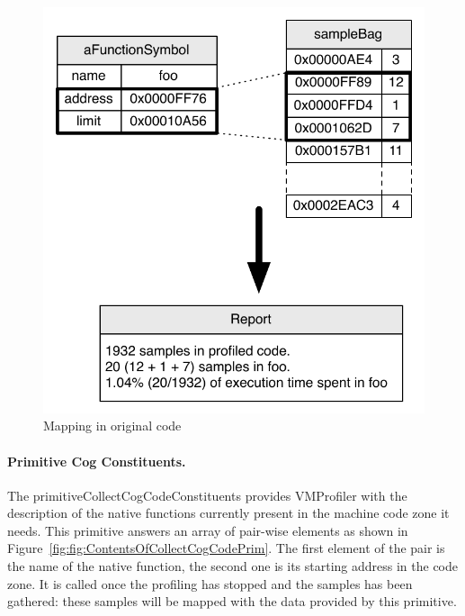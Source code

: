 \documentclass[10pt,preprint,nonatbib]{sigplanconf}
\newcommand{\figlabel}[1]{\label{fig:#1}}
\newcommand{\figref}[1]{Figure~\ref{fig:#1}}
\begin{document}
 \begin{figure}[!htp]
     \begin{center}
         \includegraphics[width=0.9\linewidth]{OriginalMapping}
         \caption{Mapping in original code}
         \figlabel{fig:OriginalMapping}
     \end{center}
 \end{figure}
 
 
 \paragraph{Primitive Cog Constituents.}
The primitiveCollectCogCodeConstituents provides VMProfiler with the description of the native functions currently present in the machine code zone it needs. 
This primitive answers an array of pair-wise elements as shown in \figref{fig:ContentsOfCollectCogCodePrim}. The first element of the pair is the name of the native function, the second one is its starting address in the code zone.
It is called once the profiling has stopped and the samples has been gathered: these samples will be mapped with the data provided by this primitive.
\end{document}
